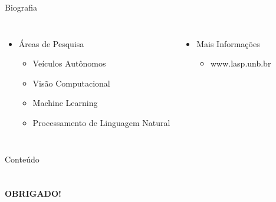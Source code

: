 \begin {frame}[shrink=30]{Biografia}
\begin{columns}[c]
\begin{itemize}
  \item Áreas de Pesquisa
  \begin{itemize}
    \item Veículos Autônomos
    \item Visão Computacional
    \item Machine Learning
    \item Processamento de Linguagem Natural
  \end{itemize}
\end{itemize}

\begin{itemize}
  \item Mais Informações
  \begin{itemize}
    \item www.lasp.unb.br
  \end{itemize}
\end{itemize}

\end{columns}
\end {frame}



\begin {frame}{Conteúdo}
\small
    \begin{multicols}{2}
        \tableofcontents
    \end{multicols}
\end {frame}















\section*{}
\begin{frame}
\begin{center}
  \Huge\ttfamily \textbf {OBRIGADO!}
\end{center}
\end{frame}



